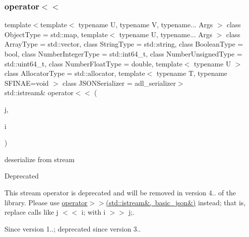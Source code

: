 \subsubsection{\texorpdfstring{operator$<$$<$}{operator<<}\hspace{0.1cm}{\footnotesize\ttfamily [2/2]}}
{\footnotesize\ttfamily template$<$template$<$ typename U, typename V, typename... Args $>$ class Object\+Type = std\+::map, template$<$ typename U, typename... Args $>$ class Array\+Type = std\+::vector, class String\+Type  = std\+::string, class Boolean\+Type  = bool, class Number\+Integer\+Type  = std\+::int64\+\_\+t, class Number\+Unsigned\+Type  = std\+::uint64\+\_\+t, class Number\+Float\+Type  = double, template$<$ typename U $>$ class Allocator\+Type = std\+::allocator, template$<$ typename T, typename S\+F\+I\+N\+A\+E=void $>$ class J\+S\+O\+N\+Serializer = adl\+\_\+serializer$>$ \\
std\+::istream\& operator$<$$<$ (\begin{DoxyParamCaption}\item[{\mbox{\hyperlink{classnlohmann_1_1basic__json}{basic\+\_\+json}}$<$ Object\+Type, Array\+Type, String\+Type, Boolean\+Type, Number\+Integer\+Type, Number\+Unsigned\+Type, Number\+Float\+Type, Allocator\+Type, J\+S\+O\+N\+Serializer $>$ \&}]{j,  }\item[{std\+::istream \&}]{i }\end{DoxyParamCaption})\hspace{0.3cm}{\ttfamily [friend]}}



deserialize from stream 

\begin{DoxyRefDesc}{Deprecated}
\item[\mbox{\hyperlink{deprecated__deprecated000003}{Deprecated}}]This stream operator is deprecated and will be removed in version 4.. of the library. Please use \mbox{\hyperlink{classnlohmann_1_1basic__json_aaf363408931d76472ded14017e59c9e8}{operator$>$$>$(std\+::istream\&, basic\+\_\+json\&)}} instead; that is, replace calls like {\ttfamily j $<$$<$ i;} with {\ttfamily i $>$$>$ j;}. \end{DoxyRefDesc}
\begin{DoxySince}{Since}
version 1..; deprecated since version 3.. 
\end{DoxySince}
\mbox{\label{classnlohmann_1_1basic__json_a5c8bb5200f5eac10d31e26be46e5b1ac}} 
